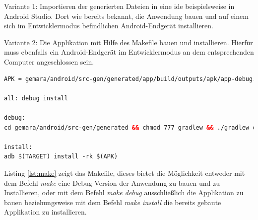Variante 1: Importieren der generierten Dateien in eine \acf{ide} beispielsweise in Android Studio. Dort wie bereits bekannt, die Anwendung bauen und auf einem sich im Entwicklermodus befindlichen Android-Endgerät installieren.

Variante 2: Die Applikation mit Hilfe des Makefile bauen und installieren. Hierfür muss ebenfalls ein Android-Endgerät im Entwicklermodus an dem entsprechenden Computer angeschlossen sein.

\newpage

\begin{lstlisting}[label=lst:make,
language=xml,
firstnumber=1,
caption=Makefile für das Bauen und Installieren der erzeugten Applikation.]				   
APK = gemara/android/src-gen/generated/app/build/outputs/apk/app-debug.apk

all: debug install

debug:
cd gemara/android/src-gen/generated && chmod 777 gradlew && ./gradlew clean assembleDebug

install:
adb $(TARGET) install -rk $(APK)
\end{lstlisting}

Listing \ref{lst:make} zeigt das Makefile, dieses bietet die Möglichkeit entweder mit dem Befehl \textit{make} eine Debug-Version der Anwendung zu bauen und zu Installieren, oder mit dem Befehl \textit{make debug} ausschließlich die Applikation zu bauen beziehungsweise mit dem Befehl \textit{make install} die bereits gebaute Applikation zu installieren.
